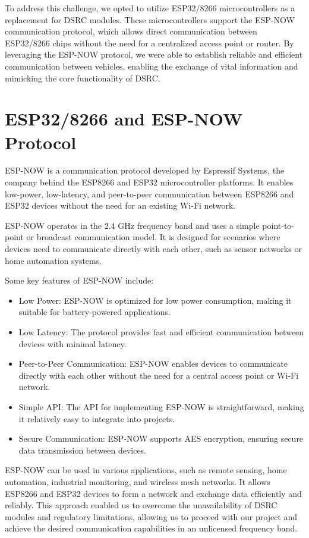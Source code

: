 \documentclass[
12pt,
oneside, 
onehalfspacing, 
nolistspacing, 
parskip, 
chapterinoneline, 
]{AASTCOMPUTER}
\begin{document}
To address this challenge, we opted to utilize ESP32/8266 microcontrollers as a replacement for DSRC modules. These microcontrollers support the ESP-NOW communication protocol, which allows direct communication between ESP32/8266 chips without the need for a centralized access point or router. By leveraging the ESP-NOW protocol, we were able to establish reliable and efficient communication between vehicles, enabling the exchange of vital information and mimicking the core functionality of DSRC.

\section{ESP32/8266 and ESP-NOW Protocol}
ESP-NOW \cite{ESP-NOW} is a communication protocol developed by Espressif Systems, the company behind the ESP8266 and ESP32 microcontroller platforms. It enables low-power, low-latency, and peer-to-peer communication between ESP8266 and ESP32 devices without the need for an existing Wi-Fi network.

ESP-NOW operates in the 2.4 GHz frequency band and uses a simple point-to-point or broadcast communication model. It is designed for scenarios where devices need to communicate directly with each other, such as sensor networks or home automation systems.

Some key features of ESP-NOW include:

\begin{itemize}
    \item Low Power: ESP-NOW is optimized for low power consumption, making it suitable for battery-powered applications.
    \item Low Latency: The protocol provides fast and efficient communication between devices with minimal latency.
    \item Peer-to-Peer Communication: ESP-NOW enables devices to communicate directly with each other without the need for a central access point or Wi-Fi network.
    \item Simple API: The API for implementing ESP-NOW is straightforward, making it relatively easy to integrate into projects.
    \item Secure Communication: ESP-NOW supports AES encryption, ensuring secure data transmission between devices.
\end{itemize}

ESP-NOW can be used in various applications, such as remote sensing, home automation, industrial monitoring, and wireless mesh networks. It allows ESP8266 and ESP32 devices to form a network and exchange data efficiently and reliably. This approach enabled us to overcome the unavailability of DSRC modules and regulatory limitations, allowing us to proceed with our project and achieve the desired communication capabilities in an unlicensed frequency band.
\end{document}
